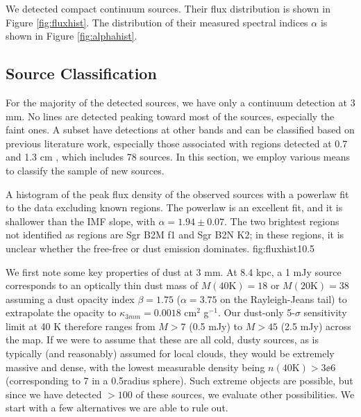 \documentclass[twocolumn]{aastex61}
\newcommand{\dsgrb}{8.4 kpc\xspace}
\begin{document}
We detected \ncores compact continuum sources.  Their flux distribution is
shown in Figure \ref{fig:fluxhist}.  The distribution of their measured
spectral indices $\alpha$ is shown in Figure \ref{fig:alphahist}.


\subsection{Source Classification}
\label{sec:classification}
For the majority of the detected sources, we have only a continuum detection at
3 mm.  No lines are detected peaking toward most of the sources, especially the
faint ones.  A subset have detections at other bands and can be classified
based on previous literature work, especially those associated with \hii
regions detected at 0.7 and 1.3 cm
\citep{Gaume1995a,Mehringer1995b,de-Pree1996a,Pree2015a}, which includes 78
sources.  In this section, we employ various means to classify the sample of
new sources.

{A histogram of the peak flux density of the observed sources with a powerlaw
fit to the data excluding known \hii regions.  The powerlaw is an excellent
fit, and it is shallower than the IMF slope, with $\alpha=1.94\pm0.07$.  The
two brightest regions not identified as \hii regions are Sgr B2M f1 and Sgr B2N
K2; in these regions, it is unclear whether the free-free or dust emission
dominates.}
{fig:fluxhist}{1}{0.5\textwidth}

We first note some key properties of dust at 3 mm.   At \dsgrb, a 1 mJy source
corresponds to an optically thin dust mass of $M(40\mathrm{K})=18$ \msun or
$M(20\mathrm{K})=38$ \msun assuming a dust opacity index $\beta=1.75$
($\alpha=3.75$ on the Rayleigh-Jeans tail) to
extrapolate the \citet{Ossenkopf1994a} opacity to $\kappa_{3mm}=0.0018$ cm$^2$
g$^{-1}$.  Our dust-only 5-$\sigma$ sensitivity limit at 40 K therefore ranges
from $M>7$ \msun (0.5 mJy) to $M>45$ \msun (2.5 mJy) across the map.  If we
were to assume that these are all cold, dusty sources, as is typically (and
reasonably) assumed for local clouds, they would be extremely massive and
dense, with the lowest measurable density being $n(40\mathrm{K}) > 3\ee{6}$
\percc (corresponding to 7 \msun in a 0.5\arcsec radius sphere).  Such extreme
objects are possible, but since we have detected $>100$ of these sources, we
evaluate other possibilities.  We start with a few alternatives we are able
to rule out.
\end{document}
